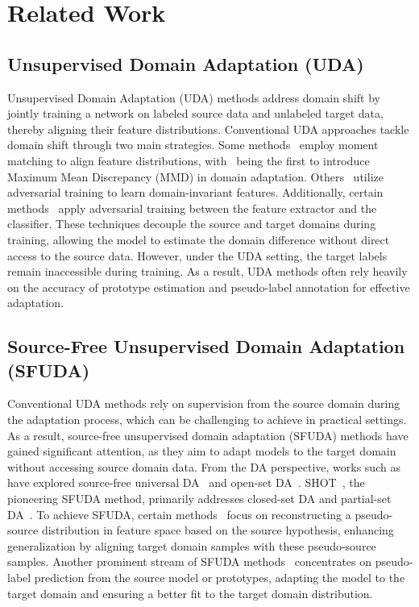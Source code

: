 \section{Related Work}
\subsection{Unsupervised Domain Adaptation (UDA)} 

Unsupervised Domain Adaptation (UDA) methods address domain shift by jointly training a network on labeled source data and unlabeled target data, thereby aligning their feature distributions. Conventional UDA approaches tackle domain shift through two main strategies. Some methods~\cite{long2015learning,sun2016return,tzeng2014deep} employ moment matching to align feature distributions, with~\cite{tzeng2014deep} being the first to introduce Maximum Mean Discrepancy (MMD) in domain adaptation. Others~\cite{ganin2015unsupervised,long2018conditional,wu2020dual} utilize adversarial training to learn domain-invariant features. Additionally, certain methods~\cite{saito2018maximum,li2021bi,du2021cross} apply adversarial training between the feature extractor and the classifier. These techniques decouple the source and target domains during training, allowing the model to estimate the domain difference without direct access to the source data. However, under the UDA setting, the target labels remain inaccessible during training. As a result, UDA methods often rely heavily on the accuracy of prototype estimation and pseudo-label annotation for effective adaptation.

\subsection{Source-Free Unsupervised Domain Adaptation (SFUDA)}

Conventional UDA methods rely on supervision from the source domain during the adaptation process, which can be challenging to achieve in practical settings. As a result, source-free unsupervised domain adaptation (SFUDA) methods have gained significant attention, as they aim to adapt models to the target domain without accessing source domain data. From the DA perspective, works such as~\cite{kundu2020universal,kundu2020towards} have explored source-free universal DA~\cite{you2019universal} and open-set DA~\cite{saito2018open}. SHOT~\cite{liang2020really}, the pioneering SFUDA method, primarily addresses closed-set DA and partial-set DA~\cite{li2020deep}. To achieve SFUDA, certain methods~\cite{qiu2021source,tian2021vdm} focus on reconstructing a pseudo-source distribution in feature space based on the source hypothesis, enhancing generalization by aligning target domain samples with these pseudo-source samples. Another prominent stream of SFUDA methods~\cite{liang2020really,chen2022self} concentrates on pseudo-label prediction from the source model or prototypes, adapting the model to the target domain and ensuring a better fit to the target domain distribution.

